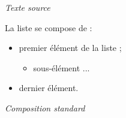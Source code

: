 \documentclass[a4paper,12pt,openright]{article}
\begin{document}
\begin{center} %
\begin{minipage}{\textwidth}
\begin{center} %
\textit{Texte source}\\
\begin{boxedverbatim}
\frlabelitems{\renewcommand{\labelitemi}{*}%
              \renewcommand{\labelitemii}{**}%
              \renewcommand{\labelitemiii}{***}%
             }
La liste se compose de :
\begin{itemize}
\item premier élément de la liste ;
  \begin{itemize}
  \item sous-élément ...
  \end{itemize}
\item dernier élément.
\end{itemize}
\end{boxedverbatim}
\end{center}
\end{minipage}
\setcounter{mpfootnote}{1} %
\renewcommand{\thempfootnote}{\arabic{mpfootnote}}
\noindent
\parbox[t]{65mm}{
\begin{center} \nofrenchtypography \nofrenchlayout \english
\textit{Composition standard} \small 
\end{center}
}%
\parbox[t]{65mm}{
\begin{center} \frenchtypography \frenchlayout

\end{center}}
\end{center}
\end{document}
